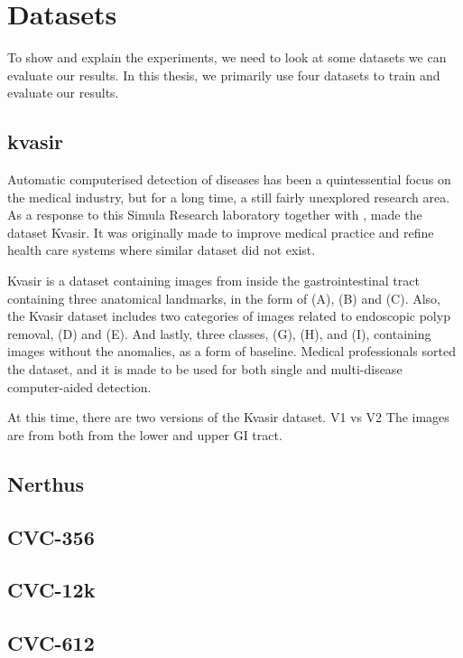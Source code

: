 \section{Datasets}
To show and explain the experiments, we need to look at some datasets we can evaluate our results. 
In this thesis, we primarily use four  datasets to train and evaluate our results.

\subsection{kvasir}


Automatic computerised detection of diseases has been a quintessential focus on the medical industry, but for a long time, a still fairly unexplored research area.  As a response to this Simula Research laboratory together with , made the dataset Kvasir.
It was originally made to improve medical practice and refine health care systems where similar dataset did not exist.

Kvasir is a dataset containing images from inside the gastrointestinal tract containing three anatomical landmarks, in the form of (A), (B) and (C). Also, the Kvasir dataset includes two categories of images related to endoscopic polyp removal, (D) and (E). And lastly, three classes, (G), (H), and (I), containing images without the anomalies, as a form of baseline. 
Medical professionals sorted the dataset, and it is made to be used for both single and multi-disease computer-aided detection. 

At this time, there are two versions of the Kvasir dataset.  V1 vs V2
The images are from both from the lower and upper GI tract. 


\subsection{Nerthus} 
\subsection{CVC-356}
\subsection{CVC-12k}
\subsection{CVC-612}


